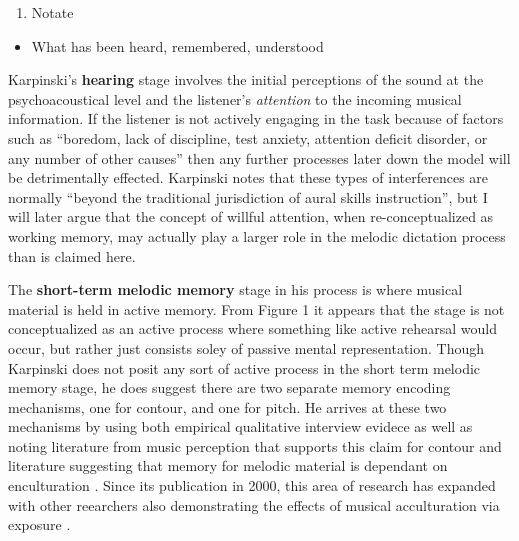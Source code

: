 \documentclass[]{book}
\providecommand{\tightlist}{%
  \setlength{\itemsep}{0pt}\setlength{\parskip}{0pt}}
\theoremstyle{definition}
\theoremstyle{definition}
\theoremstyle{definition}
\theoremstyle{remark}
\begin{document}
\begin{enumerate}
\def\labelenumi{\arabic{enumi}.}
\setcounter{enumi}{3}
\tightlist
\item
  Notate
\end{enumerate}

\begin{itemize}
\tightlist
\item
  What has been heard, remembered, understood
\end{itemize}

Karpinski's \textbf{hearing} stage involves the initial perceptions of
the sound at the psychoacoustical level and the listener's
\emph{attention} to the incoming musical information. If the listener is
not actively engaging in the task because of factors such as ``boredom,
lack of discipline, test anxiety, attention deficit disorder, or any
number of other causes'' then any further processes later down the model
will be detrimentally effected. Karpinski notes that these types of
interferences are normally ``beyond the traditional jurisdiction of
aural skills instruction'', but I will later argue that the concept of
willful attention, when re-conceptualized as working memory, may
actually play a larger role in the melodic dictation process than is
claimed here.

The \textbf{short-term melodic memory} stage in his process is where
musical material is held in active memory. From Figure 1 it appears that
the stage is not conceptualized as an active process where something
like active rehearsal would occur, but rather just consists soley of
passive mental representation. Though Karpinski does not posit any sort
of active process in the short term melodic memory stage, he does
suggest there are two separate memory encoding mechanisms, one for
contour, and one for pitch. He arrives at these two mechanisms by using
both empirical qualitative interview evidece as well as noting
literature from music perception that supports this claim for contour
\citep{dowlingScaleContourTwo1978, dewittRecognitionNovelMelodies1986}
and literature suggesting that memory for melodic material is dependant
on enculturation
\citep{ouraMemoryMelodiesSubjects1988, handelListeningIntroductionPerception1989, dowlingExpectancyAttentionMelody1990}.
Since its publication in 2000, this area of research has expanded with
other reearchers also demonstrating the effects of musical acculturation
via exposure
\citep{eerolaExpectancySamiYoiks2009, stevensMusicPerceptionCognition2012, pearceAuditoryExpectationInformation2012}.
\end{document}
